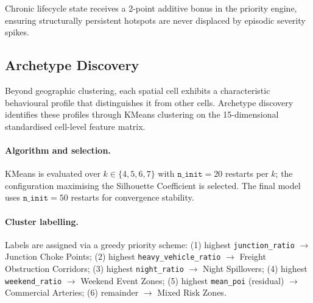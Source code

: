 \documentclass[12pt,a4paper]{article}
\begin{document}
Chronic lifecycle state receives a 2-point additive bonus in the priority engine, ensuring
structurally persistent hotspots are never displaced by episodic severity spikes.


\subsection{Archetype Discovery}

Beyond geographic clustering, each spatial cell exhibits a characteristic behavioural profile
that distinguishes it from other cells. Archetype discovery identifies these profiles through
KMeans clustering on the 15-dimensional standardised cell-level feature matrix.

\paragraph{Algorithm and selection.}
KMeans is evaluated over $k \in \{4, 5, 6, 7\}$ with $\texttt{n\_init}=20$ restarts per
$k$; the configuration maximising the Silhouette Coefficient is selected. The final model
uses $\texttt{n\_init}=50$ restarts for convergence stability.

\paragraph{Cluster labelling.}
Labels are assigned via a greedy priority scheme:
(1) highest \texttt{junction\_ratio} $\to$ Junction Choke Points;
(2) highest \texttt{heavy\_vehicle\_ratio} $\to$ Freight Obstruction Corridors;
(3) highest \texttt{night\_ratio} $\to$ Night Spillovers;
(4) highest \texttt{weekend\_ratio} $\to$ Weekend Event Zones;
(5) highest \texttt{mean\_poi} (residual) $\to$ Commercial Arteries;
(6) remainder $\to$ Mixed Risk Zones.
\end{document}
